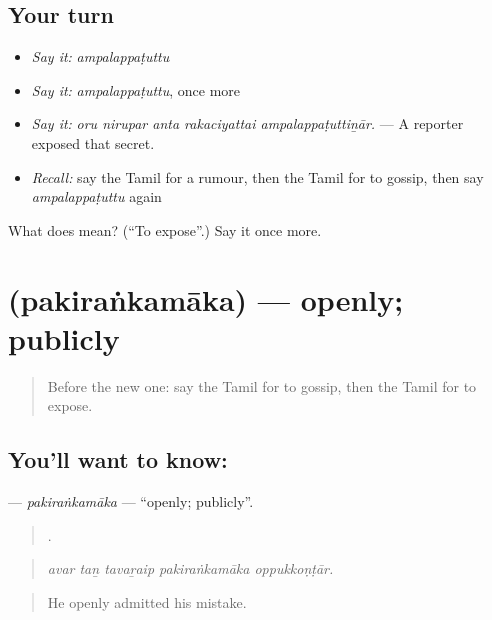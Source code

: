 \subsection*{Your turn}
\begin{itemize}
\raggedright
  \item \emph{Say it:} \emph{ampalappaṭuttu}
  \item \emph{Say it:} \emph{ampalappaṭuttu}, once more
  \item \emph{Say it:} \emph{oru nirupar anta rakaciyattai ampalappaṭuttiṉār.} — A reporter exposed that secret.
  \item \emph{Recall:} say the Tamil for a rumour, then the Tamil for to gossip, then say \emph{ampalappaṭuttu} again
\end{itemize}

\begin{tcolorbox}[breakable,colback=teal!4,colframe=teal!35!black,title={Before you move on}]
What does  mean? (\textquotedblleft{}To expose\textquotedblright{}.) Say it once more.
\end{tcolorbox}
\section[\texorpdfstring{\ta{பகிரங்கமாக} (pakiraṅkamāka)}{பகிரங்கமாக (pakiraṅkamāka)}]{ (pakiraṅkamāka) — openly; publicly}

\label{lesson:TA-C308-pakirankamaka}



\begin{quote}
Before the new one: say the Tamil for to gossip, then the Tamil for to expose.
\end{quote}

\subsection*{You'll want to know: }
\textbf{} — \emph{pakiraṅkamāka} — \textquotedblleft{}openly; publicly\textquotedblright{}.

\begin{quote}
    .
\end{quote}

\begin{quote}
\emph{avar taṉ tavaṟaip pakiraṅkamāka oppukkoṇṭār.}
\end{quote}

\begin{quote}
He openly admitted his mistake.
\end{quote}

